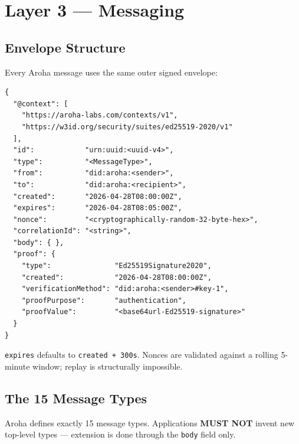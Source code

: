 \documentclass[11pt,a4paper]{article}
\begin{document}
\section{Layer 3 --- Messaging}

\subsection{Envelope Structure}

Every Aroha message uses the same outer signed envelope:

\begin{lstlisting}[caption=Standard Aroha signed envelope]
{
  "@context": [
    "https://aroha-labs.com/contexts/v1",
    "https://w3id.org/security/suites/ed25519-2020/v1"
  ],
  "id":            "urn:uuid:<uuid-v4>",
  "type":          "<MessageType>",
  "from":          "did:aroha:<sender>",
  "to":            "did:aroha:<recipient>",
  "created":       "2026-04-28T08:00:00Z",
  "expires":       "2026-04-28T08:05:00Z",
  "nonce":         "<cryptographically-random-32-byte-hex>",
  "correlationId": "<string>",
  "body": { },
  "proof": {
    "type":               "Ed25519Signature2020",
    "created":            "2026-04-28T08:00:00Z",
    "verificationMethod": "did:aroha:<sender>#key-1",
    "proofPurpose":       "authentication",
    "proofValue":         "<base64url-Ed25519-signature>"
  }
}
\end{lstlisting}

\texttt{expires} defaults to \texttt{created + 300s}. Nonces are validated against
a rolling 5-minute window; replay is structurally impossible.

\subsection{The 15 Message Types}

Aroha defines exactly 15 message types. Applications \textbf{MUST NOT} invent new
top-level types --- extension is done through the \texttt{body} field only.
\end{document}

